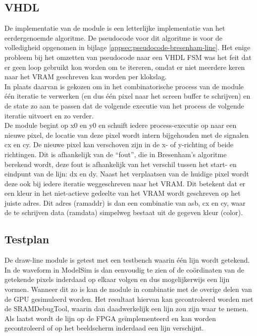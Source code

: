 \documentclass{scrartcl} %
\begin{document}
\subsection{VHDL}
De implementatie van de module is een letterlijke implementatie van het eerdergenoemde algoritme. De pseudocode voor dit algoritme is voor de volledigheid opgenomen in bijlage \ref{appsec:pseudocode-bresenham-line}. Het enige probleem bij het omzetten van pseudocode naar een VHDL FSM was het feit dat er geen loop gebruikt kon worden om te itereren, omdat er niet meerdere keren naar het VRAM geschreven kan worden per klokslag.
\\
In plaats daarvan is gekozen om in het combinatorische process van de module één iteratie te verwerken (en dus één pixel naar het screen buffer te schrijven) en de state zo aan te passen dat de volgende executie van het process de volgende iteratie uitvoert en zo verder.
\\
De module begint op x0 en y0 en schuift iedere process-executie op naar een nieuwe pixel, de locatie van deze pixel wordt intern bijgehouden met de signalen cx en cy. De nieuwe pixel kan verschoven zijn in de x- of y-richting of beide richtingen. Dit is afhankelijk van de ``fout'', die in Bresenham's algoritme berekend wordt, deze fout is afhankelijk van het verschil tussen het start- en eindpunt van de lijn: dx en dy. Naast het verplaatsen van de huidige pixel wordt deze ook bij iedere iteratie weggeschreven naar het VRAM. Dit betekent dat er een kleur in het niet-actieve gedeelte van het VRAM wordt geschreven op het juiste adres. Dit adres (ramaddr) is dan een combinatie van asb, cx en cy, waar de te schrijven data (ramdata) simpelweg bestaat uit de gegeven kleur (color).

\subsection{Testplan}
De draw-line module is getest met een testbench waarin één lijn wordt getekend. In de waveform in ModelSim is dan eenvoudig te zien of de coördinaten van de getekende pixels inderdaad op elkaar volgen en dus mogelijkerwijs een lijn vormen. Wanneer dit zo is kan de module in combinatie met de overige delen van de GPU gesimuleerd worden. Het resultaat hiervan kan gecontroleerd worden met de SRAMDebugTool, waarin dan daadwerkelijk een lijn zou zijn waar te nemen. Als laatst wordt de lijn op de FPGA geïmplementeerd en kan worden gecontroleerd of op het beeldscherm inderdaad een lijn verschijnt.
\end{document}
